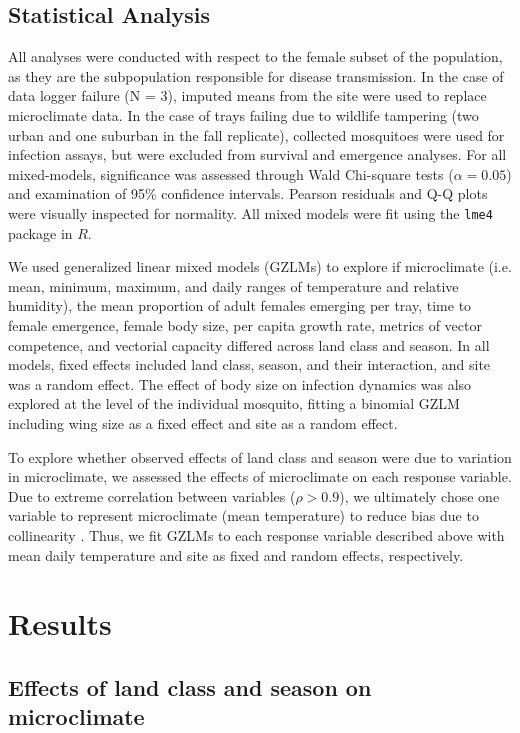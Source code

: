 \documentclass[12pt]{article}
\begin{document}
\subsection{Statistical Analysis}

All analyses were conducted with respect to the female subset of the population, as they are the subpopulation responsible for disease transmission. In the case of data logger failure (N = 3), imputed means from the site were used to replace microclimate data. In the case of trays failing due to wildlife tampering (two urban and one suburban in the fall replicate), collected mosquitoes were used for infection assays, but were excluded from survival and emergence analyses. For all mixed-models, significance was assessed through Wald Chi-square tests ($\alpha=0.05$) and examination of 95\% confidence intervals. Pearson residuals and Q-Q plots were visually inspected for normality. All mixed models were fit using the \texttt{lme4} package in $R$.

We used generalized linear mixed models (GZLMs) to explore if microclimate (i.e. mean, minimum, maximum, and daily ranges of temperature and relative humidity), the mean proportion of adult females emerging per tray, time to female emergence, female body size, per capita growth rate, metrics of vector competence, and vectorial capacity differed across land class and season. In all models, fixed effects included land class, season, and their interaction, and site was a random effect. The effect of body size on infection dynamics was also explored at the level of the individual mosquito, fitting a binomial GZLM including wing size as a fixed effect and site as a random effect.

To explore whether observed effects of land class and season were due to variation in microclimate, we assessed the effects of microclimate on each response variable. Due to extreme correlation between variables ($\rho>0.9$), we ultimately chose one variable to represent microclimate (mean temperature) to reduce bias due to collinearity \citep{graham2003}. Thus, we fit GZLMs to each response variable described above with mean daily temperature and site as fixed and random effects, respectively.

\section{Results}

\subsection{Effects of land class and season on microclimate}
\end{document}
